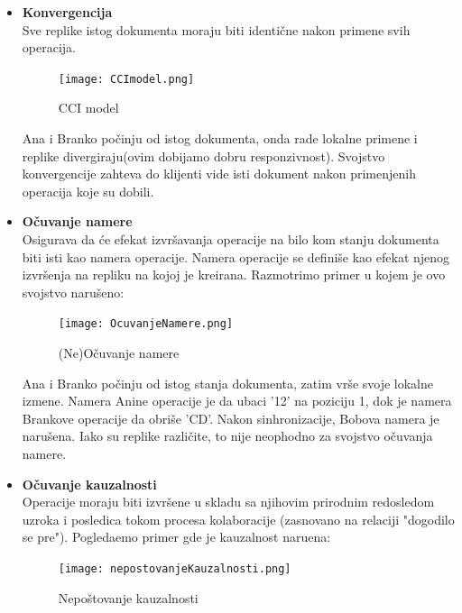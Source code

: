 \documentclass[12pt]{article}
\begin{document}
    \begin{itemize}
        \item \textbf{Konvergencija} \\
        Sve replike istog dokumenta moraju biti identične nakon primene svih operacija.

        \begin{figure}[H]
            \centering
            \texttt{[image: CCImodel.png]}
            \caption{CCI model}
            \label{fig:nls_demo}
        \end{figure}
        Ana i Branko počinju od istog dokumenta, onda rade lokalne primene i replike divergiraju(ovim dobijamo dobru responzivnost). Svojstvo konvergencije zahteva do klijenti vide isti dokument nakon primenjenih operacija koje su dobili.

        \item \textbf{Očuvanje namere} \\
        Osigurava da će efekat izvršavanja operacije na bilo kom stanju dokumenta biti isti kao namera operacije. Namera operacije se definiše kao efekat njenog izvršenja na repliku na kojoj je kreirana. Razmotrimo primer u kojem je ovo svojstvo narušeno:

        \begin{figure}[H]
            \centering
            \texttt{[image: OcuvanjeNamere.png]}
            \caption{(Ne)Očuvanje namere}
            \label{fig:nls_demo}
        \end{figure}
        Ana i Branko počinju od istog stanja dokumenta, zatim vrše svoje lokalne izmene. Namera Anine operacije je da ubaci '12' na poziciju 1, dok je namera Brankove operacije da obriše 'CD'. Nakon sinhronizacije, Bobova namera je narušena. Iako su replike različite, to nije neophodno za svojstvo očuvanja namere. 

        \item \textbf{Očuvanje kauzalnosti} \\
        Operacije moraju biti izvršene u skladu sa njihovim prirodnim redosledom uzroka i posledica tokom procesa kolaboracije (zasnovano na relaciji "dogodilo se pre"). Pogledaemo primer gde je kauzalnost naruena:

        \begin{figure}[H]
            \centering
            \texttt{[image: nepostovanjeKauzalnosti.png]}
            \caption{Nepoštovanje kauzalnosti}
            \label{fig:nls_demo}
        \end{figure}


\end{itemize}
\end{document}
